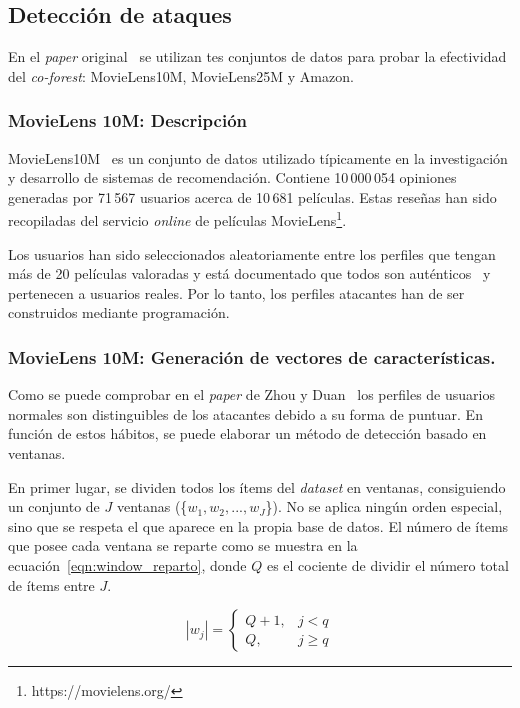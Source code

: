 \subsection{Detección de ataques}

En el \textit{paper} original~\cite{zhou2021SemisupervisedRecommendationAttack} se utilizan tes conjuntos de datos para probar la efectividad del \textit{co-forest}: MovieLens10M, MovieLens25M y Amazon.

\subsubsection{MovieLens 10M: Descripción}
 
MovieLens10M~\cite{groupLensDatasets} es un conjunto de datos utilizado típicamente en la investigación y desarrollo de sistemas de recomendación. Contiene 10\,000\,054 opiniones generadas por 71\,567 usuarios acerca de 10\,681 películas. Estas reseñas han sido recopiladas del servicio \textit{online} de películas MovieLens\footnote{https://movielens.org/}.

Los usuarios han sido seleccionados aleatoriamente entre los perfiles que tengan más de 20 películas valoradas y está documentado que todos son auténticos~\cite{zhou2021SemisupervisedRecommendationAttack} y pertenecen a usuarios reales. Por lo tanto, los perfiles atacantes han de ser construidos mediante programación.

\subsubsection{MovieLens 10M: Generación de vectores de características.}

Como se puede comprobar en el \textit{paper} de Zhou y Duan~\cite{zhou2021SemisupervisedRecommendationAttack} los perfiles de usuarios normales son distinguibles de los atacantes debido a su forma de puntuar. En función de estos hábitos, se puede elaborar un método de detección basado en ventanas.

En primer lugar, se dividen todos los ítems del \textit{dataset} en ventanas, consiguiendo un conjunto de $J$ ventanas (\{$w_1, w_2, ..., w_J$\}). No se aplica ningún orden especial, sino que se respeta el que aparece en la propia base de datos. El número de ítems que posee cada ventana se reparte como se muestra en la ecuación~\ref{eqn:window_reparto}, donde $Q$ es el cociente de dividir el número total de ítems entre $J$.
	
\[|w_j| = \left\{ \begin{array}{lr} Q + 1, & j < q\\ Q, & j \ge q \label{eqn:window_reparto} \end{array} \right. \] 

